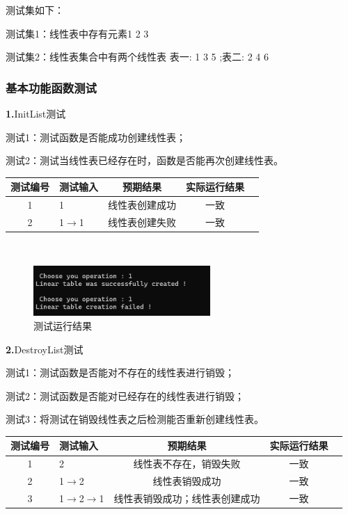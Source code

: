 \documentclass[supercite]{Experimental_Report}
\theoremstyle{definition}
\begin{document}
测试集如下：

测试集1：线性表中存有元素1 2 3

测试集2：线性表集合中有两个线性表 表一: 1 3 5 ;表二: 2 4 6 

\setcounter{paragraph}{0}

\subsubsection{基本功能函数测试}

\noindent\textbf{ 1.}InitList测试

测试1：测试函数是否能成功创建线性表；

测试2：测试当线性表已经存在时，函数是否能再次创建线性表。

\vspace{0.5em}

\begin{tabular}{|c|l|c|c|c|}
	\hline
	测试编号 & 测试输入 & 预期结果 & 实际运行结果 \\
	\hline
	1 & 1 & 线性表创建成功 & 一致 \\
	\hline
	2 & 1$\rightarrow$1 & 线性表创建失败 & 一致 \\
	\hline
\end{tabular}

~\

 \begin{figure}[H]
 	\centering
 	\includegraphics[width=0.6\textwidth]{images/线性表测试1.png}
 	\caption{测试运行结果}
 	\label{txlab}
 \end{figure}


\noindent\textbf{ 2.}DestroyList测试

测试1：测试函数是否能对不存在的线性表进行销毁；

测试2：测试函数是否能对已经存在的线性表进行销毁；

测试3：将测试在销毁线性表之后检测能否重新创建线性表。

\vspace{0.5em}

\begin{tabular}{|c|l|c|c|c|}
	\hline
	测试编号 & 测试输入 & 预期结果 & 实际运行结果 \\
	\hline
	1 & 2 & 线性表不存在，销毁失败 & 一致 \\
	\hline
	2 & 1$\rightarrow$2 & 线性表销毁成功 & 一致 \\
	\hline
	3 & 1$\rightarrow$2$\rightarrow$1 & 线性表销毁成功；线性表创建成功 & 一致 \\
	\hline
\end{tabular}
\end{document}
